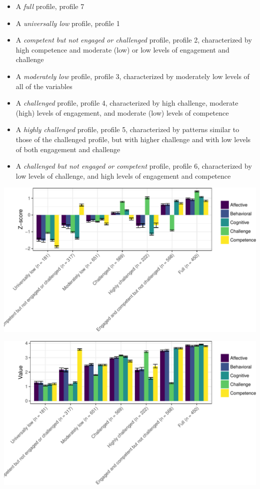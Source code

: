 \documentclass[]{msu-thesis}
\providecommand{\tightlist}{%
  \setlength{\itemsep}{0pt}\setlength{\parskip}{0pt}}
\theoremstyle{definition}
\theoremstyle{definition}
\theoremstyle{definition}
\theoremstyle{remark}
\begin{document}
\begin{itemize}
\tightlist
\item
  A \emph{full} profile, profile 7
\item
  A \emph{universally low} profile, profile 1
\item
  A \emph{competent but not engaged or challenged} profile, profile 2,
  characterized by high competence and moderate (low) or low levels of
  engagement and challenge
\item
  A \emph{moderately low} profile, profile 3, characterized by
  moderately low levels of all of the variables
\item
  A \emph{challenged} profile, profile 4, characterized by high
  challenge, moderate (high) levels of engagement, and moderate (low)
  levels of competence
\item
  A \emph{highly challenged} profile, profile 5, characterized by
  patterns similar to those of the challenged profile, but with higher
  challenge and with low levels of both engagement and challenge
\item
  A \emph{challenged but not engaged or competent} profile, profile 6,
  characterized by low levels of challenge, and high levels of
  engagement and competence
\end{itemize}

\begin{center}\includegraphics[width=0.9\linewidth]{rosenberg-dissertation_files/figure-latex/m1_7p-1} \end{center}

\begin{center}\includegraphics[width=0.9\linewidth]{rosenberg-dissertation_files/figure-latex/m1_7p-2} \end{center}
\end{document}
